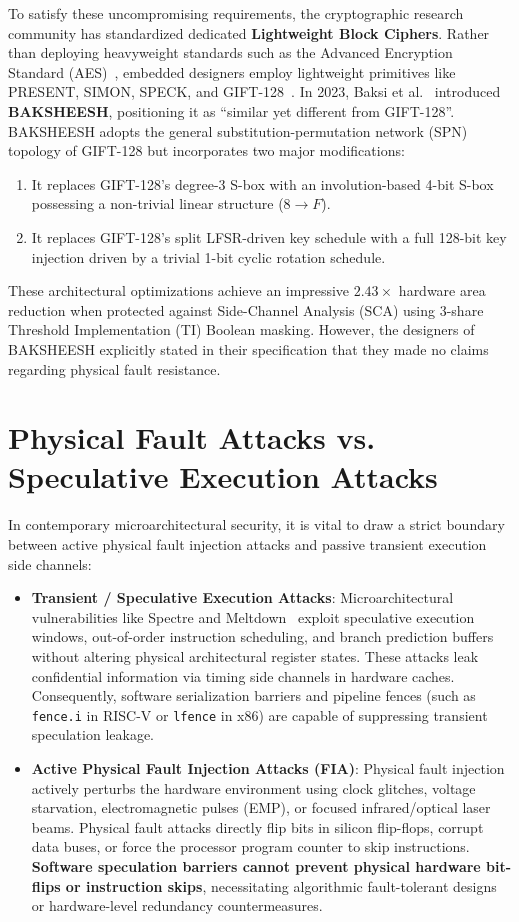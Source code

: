 \documentclass[12pt,a4paper,oneside]{report}
\begin{document}
To satisfy these uncompromising requirements, the cryptographic research community has standardized dedicated \textbf{Lightweight Block Ciphers}. Rather than deploying heavyweight standards such as the Advanced Encryption Standard (AES)~\cite{biham1997differential}, embedded designers employ lightweight primitives like PRESENT, SIMON, SPECK, and GIFT-128~\cite{banik2017gift}. In 2023, Baksi et al.~\cite{baksi2023baksheesh} introduced \textbf{BAKSHEESH}, positioning it as ``similar yet different from GIFT-128''. BAKSHEESH adopts the general substitution-permutation network (SPN) topology of GIFT-128 but incorporates two major modifications:
\begin{enumerate}
    \item It replaces GIFT-128's degree-3 S-box with an involution-based 4-bit S-box possessing a non-trivial linear structure ($8 \to F$).
    \item It replaces GIFT-128's split LFSR-driven key schedule with a full 128-bit key injection driven by a trivial 1-bit cyclic rotation schedule.
\end{enumerate}
These architectural optimizations achieve an impressive $2.43\times$ hardware area reduction when protected against Side-Channel Analysis (SCA) using 3-share Threshold Implementation (TI) Boolean masking. However, the designers of BAKSHEESH explicitly stated in their specification that they made no claims regarding physical fault resistance.

\section{Physical Fault Attacks vs. Speculative Execution Attacks}
\label{sec:faults_vs_speculation}
In contemporary microarchitectural security, it is vital to draw a strict boundary between active physical fault injection attacks and passive transient execution side channels:
\begin{itemize}
    \item \textbf{Transient / Speculative Execution Attacks}: Microarchitectural vulnerabilities like Spectre and Meltdown~\cite{canella2020systematic} exploit speculative execution windows, out-of-order instruction scheduling, and branch prediction buffers without altering physical architectural register states. These attacks leak confidential information via timing side channels in hardware caches. Consequently, software serialization barriers and pipeline fences (such as \texttt{fence.i} in RISC-V or \texttt{lfence} in x86) are capable of suppressing transient speculation leakage.
    \item \textbf{Active Physical Fault Injection Attacks (FIA)}: Physical fault injection actively perturbs the hardware environment using clock glitches, voltage starvation, electromagnetic pulses (EMP), or focused infrared/optical laser beams. Physical fault attacks directly flip bits in silicon flip-flops, corrupt data buses, or force the processor program counter to skip instructions. \textbf{Software speculation barriers cannot prevent physical hardware bit-flips or instruction skips}, necessitating algorithmic fault-tolerant designs or hardware-level redundancy countermeasures.
\end{itemize}
\end{document}
